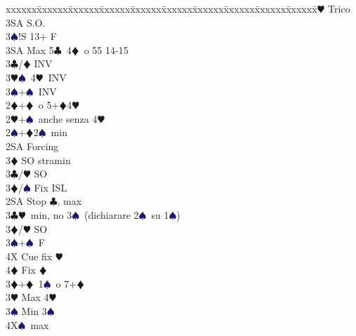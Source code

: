 \documentclass[a4paper,italian]{article}
\newcommand{\BC}{\textcolor{OliveGreen}{$\clubsuit$}}
\newcommand{\BD}{\textcolor{RedOrange}{$\vardiamondsuit$}}
\newcommand{\BH}{\textcolor{Red2}{$\varheartsuit${}}}
\newcommand{\BS}{\textcolor{MidnightBlue}{$\spadesuit${}}}
\newenvironment{bidtable}
{\begin{tabbing}

    xxxxxx\=xxxxxx\=xxxxxx\=xxxxxx\=xxxxxx\=xxxxxx\=xxxxxx\=xxxxxx\=xxxxxx\=xxxxxx\=\kill}
{\end{tabbing} }%
\begin{document}
\begin{multicols}{2}
\begin{bidtable}
                                            4\BH \> Trico\-\\
                                            3SA \> S.O.\-\\
                                            3\BS {}!S 13+ F\\
                                            3SA \> Max 5\BC\ 4\BD\ o 55 14-15\-\\
                                            3\BC/\BD \> INV\\
                                            3\BH {}\BS\ 4\BH\ INV\\
                                            3\BS {}+\BS\ INV\-\\
                                            2\BD {}+\BD\ o 5+\BD4\BH\+\\
                                            2\BH {}+\BS\ anche senza 4\BH\+\\
                                            2\BS {}+\BD 2\BS\ min \+\\
                                            2SA \> Forcing \+\\
                                            3\BD \> SO stramin \-\\
                                            3\BC/\BH\> SO\\
                                            3\BD/\BS \> Fix ISL\-\\
                                            2SA \> Stop \BC, max\\
                                            3\BC {}\BH\ min, no 3\BS\ (dichiarare 2\BS\ su 1\BS)\+\\
                                            3\BD/\BH\> SO\\
                                            3\BS{}+\BS\ F\\
                                            4X\> Cue fix \BH\\
                                            4\BD\> Fix \BD\-\\
                                            3\BD{}+\BD\ 1\BS\ o 7+\BD\\
                                            3\BH\> Max 4\BH\\
                                            3\BS\> Min 3\BS\\
                                            4X\BS\ max\-\-\\


\end{bidtable}
\end{multicols}
\end{document}
